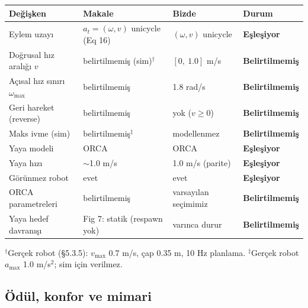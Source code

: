 \documentclass[11pt,a4paper]{article}
\newcommand{\dmatch}{\textcolor{cgreen}{\textbf{Eşleşiyor}}}
\newcommand{\dunspec}{\textcolor{camber}{\textbf{Belirtilmemiş}}}
\begin{document}
\begin{table}[H]
\centering\small
\begin{tabular}{@{}p{3.2cm}p{4.0cm}p{4.4cm}l@{}}
\toprule
\textbf{Değişken} & \textbf{Makale} & \textbf{Bizde} & \textbf{Durum} \\
\midrule
Eylem uzayı & $a_t=(\omega,v)$ unicycle (Eq 16) & $(\omega,v)$ unicycle & \dmatch \\
Doğrusal hız aralığı $v$ & belirtilmemiş (sim)$^{\dagger}$ & $[0,\ 1.0]$ m/s & \dunspec \\
Açısal hız sınırı $\omega_{\max}$ & belirtilmemiş & 1.8 rad/s & \dunspec \\
Geri hareket (reverse) & belirtilmemiş & yok ($v\geq0$) & \dunspec \\
Maks ivme (sim) & belirtilmemiş$^{\ddagger}$ & modellenmez & \dunspec \\
Yaya modeli & ORCA & ORCA & \dmatch \\
Yaya hızı & $\sim$1.0 m/s & 1.0 m/s (parite) & \dmatch \\
Görünmez robot & evet & evet & \dmatch \\
ORCA parametreleri & belirtilmemiş & varsayılan seçimimiz & \dunspec \\
Yaya hedef davranışı & Fig 7: statik (respawn yok) & varınca durur & \dunspec \\
\bottomrule
\end{tabular}
\par{\scriptsize $^{\dagger}$Gerçek robot (\S5.3.5): $v_{\max}$ 0.7 m/s, çap 0.35 m, 10 Hz planlama.
$^{\ddagger}$Gerçek robot $a_{\max}$ 1.0 m/s$^2$; sim için verilmez.}
\end{table}

\subsection{Ödül, konfor ve mimari}
\end{document}

